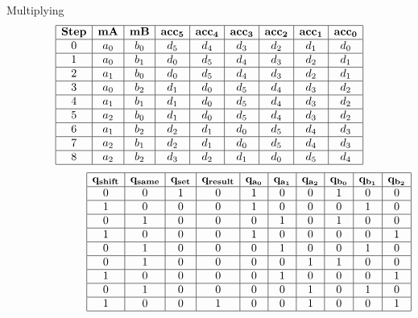 \begin{frame}{Multiplying}
\scriptsize
\[
\begin{array}{|c|c|c|c|c|c|c|c|c|c|c|c|c|c|c|c|c|c|c|}
\hline
\mathbf{Step} & \mathbf{mA} & \mathbf{mB} & \mathbf{acc_5} & \mathbf{acc_4}  & \mathbf{acc_3} & \mathbf{acc_2} & \mathbf{acc_1} & \mathbf{acc_0} \\ \hline
0 & a_0 & b_0 & d_5 & d_4 & d_3 & d_2 & d_1 & d_0 \\ \hline
1 & a_0 & b_1 & d_0 & d_5 & d_4 & d_3 & d_2 & d_1 \\ \hline
2 & a_1 & b_0 & d_0 & d_5 & d_4 & d_3 & d_2 & d_1 \\ \hline
3 & a_0 & b_2 & d_1 & d_0 & d_5 & d_4 & d_3 & d_2 \\ \hline
4 & a_1 & b_1 & d_1 & d_0 & d_5 & d_4 & d_3 & d_2 \\ \hline
5 & a_2 & b_0 & d_1 & d_0 & d_5 & d_4 & d_3 & d_2 \\ \hline
6 & a_1 & b_2 & d_2 & d_1 & d_0 & d_5 & d_4 & d_3 \\ \hline
7 & a_2 & b_1 & d_2 & d_1 & d_0 & d_5 & d_4 & d_3 \\ \hline
8 & a_2 & b_2 & d_3 & d_2 & d_1 & d_0 & d_5 & d_4 \\ \hline
\end{array}
\]
\[
\hspace{2.5cm}
\begin{array}{|c|c|c|c|c|c|c|c|c|c|c|c|c|c|c|c|c|c|c|}
\hline
\mathbf{q_{shift}} & \mathbf{q_{same}} & \mathbf{q_{set}} & \mathbf{q_{result}} & \mathbf{q_{a_0}} & \mathbf{q_{a_1}} & \mathbf{q_{a_2}} & \mathbf{q_{b_0}} & \mathbf{q_{b_1}} & \mathbf{q_{b_2}} \\ \hline
0 & 0 & 1 & 0 & 1 & 0 & 0 & 1 & 0 & 0\\ \hline
1 & 0 & 0 & 0 & 1 & 0 & 0 & 0 & 1 & 0\\ \hline
0 & 1 & 0 & 0 & 0 & 1 & 0 & 1 & 0 & 0\\ \hline
1 & 0 & 0 & 0 & 1 & 0 & 0 & 0 & 0 & 1\\ \hline
0 & 1 & 0 & 0 & 0 & 1 & 0 & 0 & 1 & 0\\ \hline
0 & 1 & 0 & 0 & 0 & 0 & 1 & 1 & 0 & 0\\ \hline
1 & 0 & 0 & 0 & 0 & 1 & 0 & 0 & 0 & 1\\ \hline
0 & 1 & 0 & 0 & 0 & 0 & 1 & 0 & 1 & 0\\ \hline
1 & 0 & 0 & 1 & 0 & 0 & 1 & 0 & 0 & 1\\ \hline
\end{array}
\]
\end{frame}
